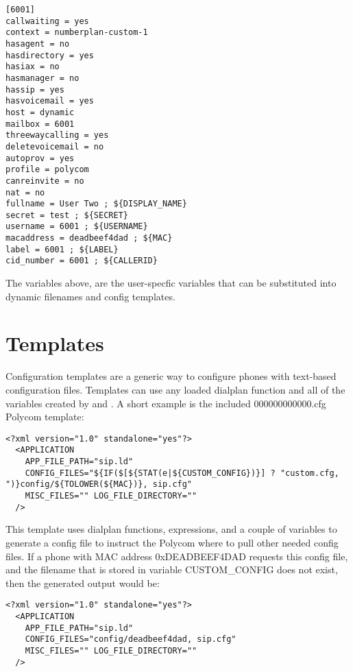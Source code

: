 \begin{astlisting}
\begin{verbatim}
[6001]
callwaiting = yes
context = numberplan-custom-1
hasagent = no
hasdirectory = yes
hasiax = no
hasmanager = no
hassip = yes
hasvoicemail = yes
host = dynamic
mailbox = 6001
threewaycalling = yes
deletevoicemail = no
autoprov = yes
profile = polycom
canreinvite = no
nat = no
fullname = User Two ; ${DISPLAY_NAME}
secret = test ; ${SECRET}
username = 6001 ; ${USERNAME}
macaddress = deadbeef4dad ; ${MAC}
label = 6001 ; ${LABEL}
cid_number = 6001 ; ${CALLERID}
\end{verbatim}
\end{astlisting}

The variables above, are the user-specfic variables that can be substituted into dynamic 
filenames and config templates.

\section{Templates}

Configuration templates are a generic way to configure phones with text-based 
configuration files. Templates can use any loaded dialplan function and all of the 
variables created by  and . A short example is the 
included 000000000000.cfg Polycom template:

\begin{astlisting}
\begin{verbatim}
<?xml version="1.0" standalone="yes"?>
  <APPLICATION 
    APP_FILE_PATH="sip.ld"
    CONFIG_FILES="${IF($[${STAT(e|${CUSTOM_CONFIG})}] ? "custom.cfg, 
")}config/${TOLOWER(${MAC})}, sip.cfg"
    MISC_FILES="" LOG_FILE_DIRECTORY=""
  />
\end{verbatim}
\end{astlisting}

This template uses dialplan functions, expressions, and a couple of variables to generate 
a config file to instruct the Polycom where to pull other needed config files. If a phone 
with MAC address 0xDEADBEEF4DAD requests this config file, and the filename that is 
stored in variable CUSTOM\_CONFIG does not exist, then the generated output would be:

\begin{astlisting}
\begin{verbatim}
<?xml version="1.0" standalone="yes"?>
  <APPLICATION
    APP_FILE_PATH="sip.ld"
    CONFIG_FILES="config/deadbeef4dad, sip.cfg"
    MISC_FILES="" LOG_FILE_DIRECTORY=""
  />
\end{verbatim}
\end{astlisting}

